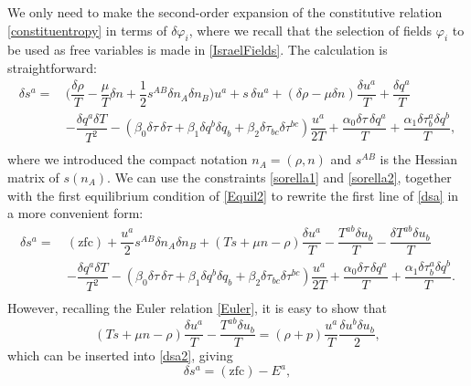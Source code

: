 \documentclass[a4paper, amsfonts, amssymb, amsmath, reprint, showkeys, nofootinbib, twoside, onecolumn,notitlepage]{revtex4-1}
\begin{document}
We only need to make the second-order expansion of the constitutive relation \eqref{constituentropy} in terms of $\delta \varphi_i$, where we recall that the selection of fields $\varphi_i$ to be used as free variables is made in \eqref{IsraelFields}. The calculation is straightforward:
\begin{equation}\label{dsa}
\begin{split}
\delta s^a = \, &  \bigg( \dfrac{\delta \rho}{T} -\dfrac{\mu}{T} \delta n +\dfrac{1}{2} s^{AB} \delta n_A \delta n_B \bigg)u^a + s \, \delta u^a + (\delta \rho - \mu \delta n) \dfrac{\delta u^a}{T} + \dfrac{\delta q^a}{T}       \\
& - \dfrac{\delta q^a \delta T}{T^2} - (\beta_0 \delta\tau \, \delta \tau +\beta_1 \delta q^b \delta q_b +\beta_2 \delta \tau_{bc} \delta \tau^{bc}) \dfrac{u^a}{2T} + \dfrac{\alpha_0 \delta \tau \, \delta q^a}{T} +\dfrac{\alpha_1 \delta \tau^a_b \delta  q^b}{T}, \\
\end{split}
\end{equation}
where we introduced the compact notation $n_A=(\rho,n)$ and $s^{AB}$ is the Hessian matrix of $s(n_A)$. We can use the constraints \eqref{sorella1} and \eqref{sorella2}, together with the first equilibrium condition of \eqref{Equil2} to rewrite the first line of \eqref{dsa} in a more convenient form:
\begin{equation}\label{dsa2}
\begin{split}
\delta s^a = \, &  (\text{zfc})+ \dfrac{u^a}{2} s^{AB} \delta n_A \delta n_B + (Ts +\mu n -\rho)  \dfrac{\delta u^a}{T} - \dfrac{T^{ab} \delta u_b}{T} - \dfrac{\delta T^{ab} \delta u_b}{T}   \\
& - \dfrac{\delta q^a \delta T}{T^2} - (\beta_0 \delta\tau \, \delta \tau +\beta_1 \delta q^b \delta q_b +\beta_2 \delta \tau_{bc} \delta \tau^{bc}) \dfrac{u^a}{2T} + \dfrac{\alpha_0 \delta \tau \, \delta q^a}{T} +\dfrac{\alpha_1 \delta \tau^a_b \delta  q^b}{T}. \\
\end{split}
\end{equation}
However, recalling the Euler relation \eqref{Euler}, it is easy to show that
\begin{equation}
(Ts +\mu n -\rho)  \dfrac{\delta u^a}{T} - \dfrac{T^{ab} \delta u_b}{T} = (\rho + p) \dfrac{u^a}{T}  \dfrac{\delta u^b \delta u_b}{2}, 
\end{equation}
which can be inserted into \eqref{dsa2}, giving
\begin{equation}
\delta s^a = (\text{zfc}) - E^a,
\end{equation}
\end{document}
